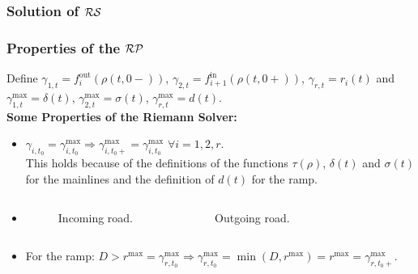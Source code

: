 \begin{frame}
	\frametitle{Solution of $\mathcal{RS}$}
	\begin{figure}[ht]
\centering

\label{fig:RiemProb}
\end{figure}
\end{frame}

\begin{frame}[fragile]
	\frametitle{Properties of the $\mathcal{RP}$}
Define $\gamma_{1,t}=f^{\text{out}}_i(\rho(t,0-))$, $\gamma_{2,t}=f^{\text{in}}_{i+1}(\rho(t,0+))$, $\gamma_{r,t}=r_i(t)$ and $\gamma^{\max}_{1,t}=\delta(t)$, $\gamma^{\max}_{2,t}=\sigma(t)$, $\gamma^{\max}_{r,t}=d(t)$. \\
\vspace*{2mm}
\textbf{Some Properties of the Riemann Solver:}\\
	\begin{itemize}
	\item<1-> $\gamma_{i,t_{0}}=\gamma^{\max}_{i,t_{0}} \Rightarrow \gamma^{\max}_{i,t_{0}+}=\gamma^{\max}_{i,t_{0}}$ $\forall i=1,2,r$. \\ \vspace*{2mm} This holds because of the definitions of the functions $\tau(\rho)$, $\delta(t)$ and $\sigma(t)$ for the mainlines and the definition of $d(t)$ for the ramp.
	
	\item[]{\begin{columns}
	\begin{figure}[ht]
\centering
{
\resizebox{.7\columnwidth}{!}{
}
\caption{Incoming road.}
\label{fig:PI1}}
\end{figure}
	\begin{figure}[ht]
\centering
{
\resizebox{.7\columnwidth}{!}{
}
\caption{Outgoing road.}
\label{fig:PO2}}
\end{figure}
\end{columns}}
\item[]{ For the ramp: $D>r^{\max}=\gamma_{r,t_{0}}^{\max} \Rightarrow \gamma_{r,t_{0}}^{\max}=\min\left(D,r^{\max}\right)=r^{\max}=\gamma_{r,t_{0}+}^{\max}.$}
\end{itemize}
\end{frame}

